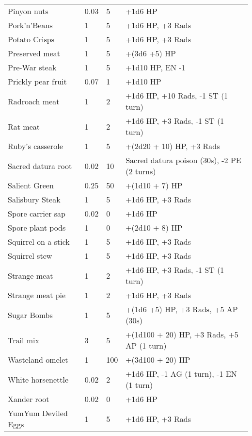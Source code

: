 \begin{longtable}{|p{4cm}|p{1.5cm}|p{1.5cm}|p{9cm}|}
Pinyon nuts & 0.03 & 5 & +1d6 HP \\
Pork'n'Beans & 1 & 5 & +1d6 HP, +3 Rads \\
Potato Crisps & 1 & 5 & +1d6 HP, +3 Rads \\
Preserved meat & 1 & 5 & +(3d6 +5) HP \\
Pre-War steak & 1 & 5 & +1d10 HP, EN -1 \\
Prickly pear fruit & 0.07 & 1 & +1d10 HP \\
Radroach meat & 1 & 2 & +1d6 HP, +10 Rads, -1 ST (1 turn) \\
Rat meat & 1 & 2 & +1d6 HP, +3 Rads, -1 ST (1 turn) \\
Ruby's casserole & 1 & 5 & +(2d20 + 10) HP, +3 Rads \\
Sacred datura root & 0.02 & 10 & Sacred datura poison (30s), -2 PE (2 turns) \\
Salient Green & 0.25 & 50 & +(1d10 + 7) HP \\
Salisbury Steak & 1 & 5 & +1d6 HP, +3 Rads \\
Spore carrier sap & 0.02 & 0 & +1d6 HP \\
Spore plant pods & 1 & 0 & +(2d10 + 8) HP \\
Squirrel on a stick & 1 & 5 & +1d6 HP, +3 Rads \\
Squirrel stew & 1 & 5 & +1d6 HP, +3 Rads \\
Strange meat & 1 & 2 & +1d6 HP, +3 Rads, -1 ST (1 turn) \\
Strange meat pie & 1 & 2 & +1d6 HP, +3 Rads \\
Sugar Bombs & 1 & 5 & +(1d6 +5) HP, +3 Rads, +5 AP (30s) \\
Trail mix & 3 & 5 & +(1d100 + 20) HP, +3 Rads, +5 AP (1 turn) \\
Wasteland omelet & 1 & 100 & +(3d100 + 20) HP \\
White horsenettle & 0.02 & 2 & +1d6 HP, -1 AG (1 turn), -1 EN (1 turn) \\
Xander root & 0.02 & 0 & +1d6 HP \\
YumYum Deviled Eggs & 1 & 5 & +1d6 HP, +3 Rads \\
\hline

\end{longtable}
